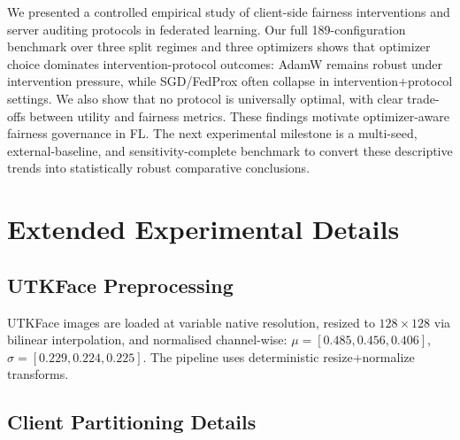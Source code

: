 ﻿\documentclass{article}
\begin{document}
We presented a controlled empirical study of client-side fairness
interventions and server auditing protocols in federated learning.
Our full 189-configuration benchmark over three split regimes and
three optimizers shows that optimizer choice dominates
intervention-protocol outcomes: AdamW remains robust under
intervention pressure, while SGD/FedProx often collapse in
intervention+protocol settings.
We also show that no protocol is universally optimal, with clear
trade-offs between utility and fairness metrics.
These findings motivate optimizer-aware fairness governance in FL.
The next experimental milestone is a multi-seed, external-baseline,
and sensitivity-complete benchmark to convert these descriptive trends
into statistically robust comparative conclusions.

\appendix

\section{Extended Experimental Details}
\label{app:details}

\subsection{UTKFace Preprocessing}
UTKFace images are loaded at variable native resolution,
resized to $128\!\times\!128$ via bilinear interpolation, and
normalised channel-wise:
$\mu = [0.485, 0.456, 0.406]$, $\sigma = [0.229, 0.224, 0.225]$.
The pipeline uses deterministic resize+normalize transforms.

\subsection{Client Partitioning Details}
\end{document}
